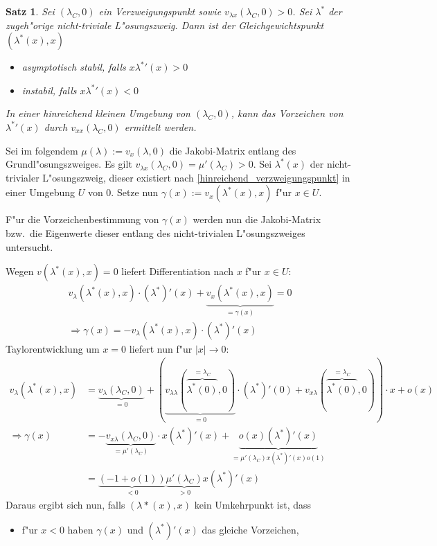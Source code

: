 \documentclass[a4paper, 13pt]{scrreprt}
\newtheorem{satz}{Satz}[section]
\theoremstyle{definition} \newtheorem{definition}{Definition}[section]
\newenvironment{beweis}[1][Beweis]{\begin{trivlist}
\item[\hskip \labelsep {\bfseries #1}]}{\end{trivlist}}
\begin{document}
\begin{satz}
Sei $(\lambda_C, 0)$ ein Verzweigungspunkt sowie $v_{\lambda x}(\lambda_C, 0) > 0$. Sei $\lambda^*$ der zugeh"orige nicht-triviale L"osungszweig.
Dann ist der Gleichgewichtspunkt $(\lambda^*(x), x)$ 
\begin{itemize}
\item asymptotisch stabil, falls $x{\lambda^*}'(x) > 0$
\item instabil, falls $x{\lambda^*}'(x) < 0$
\end{itemize}
In einer hinreichend kleinen Umgebung von $(\lambda_C, 0)$, kann das Vorzeichen von ${\lambda^*}'(x)$ durch $v_{xx}(\lambda_C,0)$ ermittelt werden.
\end{satz}

\begin{beweis}

Sei im folgendem $\mu(\lambda):=v_x(\lambda,0)$ die Jakobi-Matrix entlang des Grundl"osungszweiges. Es gilt $v_{\lambda x}(\lambda_C,0) = \mu'(\lambda_C) >0$. Sei $\lambda^*(x)$ der nicht-trivialer L"osungszweig, dieser existiert nach \eqref{hinreichend_verzweigungspunkt} in einer Umgebung $U$ von $0$. Setze nun $\gamma(x):=v_x(\lambda^*(x),x)$ f"ur $x \in U$.

F"ur die Vorzeichenbestimmung von $\gamma(x)$ werden nun die Jakobi-Matrix bzw.\ die Eigenwerte dieser entlang des nicht-trivialen L"osungszweiges untersucht.

Wegen $v(\lambda^*(x),x)=0$ liefert Differentiation nach $x$ f"ur $x\in U$:
\begin{align*}
v_\lambda(\lambda^*(x),x)\cdot(\lambda^*)'(x) + \underbrace{v_x(\lambda^*(x),x)}_{=\gamma(x)} = 0\\
\Rightarrow\gamma(x) = -v_\lambda(\lambda^*(x),x)\cdot(\lambda^*)'(x)
\end{align*}
Taylorentwicklung um $x=0$ liefert nun f"ur $|x|\to 0$:
\begin{align*}
v_\lambda(\lambda^*(x),x) &= \underbrace{v_\lambda(\lambda_C,0)}_{= 0} + (\underbrace{v_{\lambda\lambda}(\overbrace{\lambda^*(0)}^{= \lambda_C},0)}_{= 0}\cdot(\lambda^*)'(0) + v_{x\lambda}(\overbrace{\lambda^*(0)}^{= \lambda_C},0))\cdot x + o(x)\\
\Rightarrow\gamma(x) &= -\underbrace{v_{x\lambda}(\lambda_C,0)}_{= \mu'(\lambda_C)}\cdot x(\lambda^*)'(x) + \underbrace{o(x)(\lambda^*)'(x)}_{= \mu'(\lambda_C)x(\lambda^*)'(x)o(1)}\\
&= \underbrace{(-1+o(1))}_{<0}\underbrace{\mu'(\lambda_C)}_{>0}x(\lambda^*)'(x)
\end{align*}
Daraus ergibt sich nun, falls $(\lambda*(x), x)$ kein Umkehrpunkt ist, dass
\begin{itemize}
\item
f"ur $x<0$ haben $\gamma(x)$ und $(\lambda^*)'(x)$ das gleiche Vorzeichen,


\end{itemize}
\end{beweis}
\end{document}
